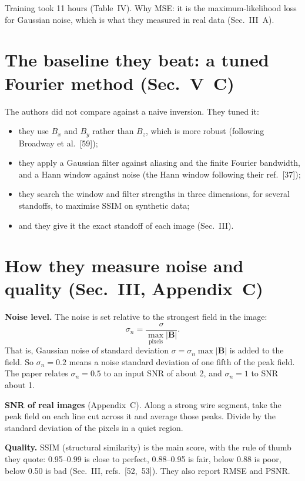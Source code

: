Training took 11 hours (Table~IV). Why MSE: it is the maximum-likelihood loss for Gaussian noise, which is what they
measured in real data (Sec.~III~A).

\section{The baseline they beat: a tuned Fourier method (Sec.~V~C)}\label{sec:magic_fourier}

The authors did not compare against a naive inversion. They tuned it:
\begin{itemize}
\item they use $B_x$ and $B_y$ rather than $B_z$, which is more robust (following Broadway et al.\ [59]);
\item they apply a Gaussian filter against aliasing and the finite Fourier bandwidth, and a Hann window against noise
(the Hann window following their ref.~[37]);
\item they search the window and filter strengths in three dimensions, for several standoffs, to maximise SSIM on
synthetic data;
\item and they give it the exact standoff of each image (Sec.~III).
\end{itemize}

\section{How they measure noise and quality (Sec.~III, Appendix~C)}

\textbf{Noise level.} The noise is set relative to the strongest field in the image:
\begin{equation}
\sigma_n = \frac{\sigma}{\max_{\text{pixels}} |\bm B|}.
\label{eq:magic_sigma_n}
\end{equation}
That is, Gaussian noise of standard deviation $\sigma = \sigma_n \max|\bm B|$ is added to the field.
So $\sigma_n = 0.2$ means a noise standard deviation of one fifth of the peak field. The paper relates $\sigma_n = 0.5$
to an input SNR of about 2, and $\sigma_n = 1$ to SNR about 1.

\textbf{SNR of real images} (Appendix~C). Along a strong wire segment, take the peak field on each line cut across it and
average those peaks. Divide by the standard deviation of the pixels in a quiet region.

\textbf{Quality.} SSIM (structural similarity) is the main score, with the rule of thumb they quote: 0.95--0.99 is close
to perfect, 0.88--0.95 is fair, below 0.88 is poor, below 0.50 is bad (Sec.~III, refs.~[52,~53]). They also report RMSE
and PSNR.


